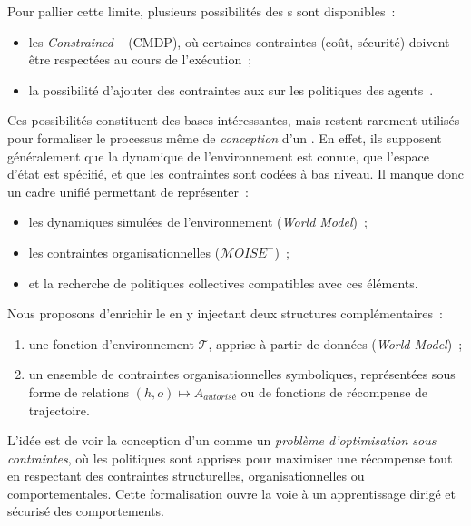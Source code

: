 \medskip

\noindent
Pour pallier cette limite, plusieurs possibilités des s sont disponibles~:
\begin{itemize}
  \item les \textit{Constrained }~\cite{Altman1999} (CMDP), où certaines contraintes (coût, sécurité) doivent être respectées au cours de l'exécution~;
  \item la possibilité d'ajouter des contraintes aux  sur les politiques des agents~\cite{Beynier2010}.
\end{itemize}

\noindent
Ces possibilités constituent des bases intéressantes, mais restent rarement utilisés pour formaliser le processus même de \textit{conception} d'un . En effet, ils supposent généralement que la dynamique de l'environnement est connue, que l'espace d'état est spécifié, et que les contraintes sont codées à bas niveau. Il manque donc un cadre unifié permettant de représenter~:
\begin{itemize}
  \item les dynamiques simulées de l'environnement (\textit{World Model})~;
  \item les contraintes organisationnelles ($\mathcal{M}OISE^+$)~;
  \item et la recherche de politiques collectives compatibles avec ces éléments.
\end{itemize}

\medskip

\noindent
Nous proposons d'enrichir le  en y injectant deux structures complémentaires~:
\begin{enumerate}
  \item une fonction d'environnement $\mathcal{T}$, apprise à partir de données (\textit{World Model})~;
  \item un ensemble de contraintes organisationnelles symboliques, représentées sous forme de relations $(h, o) \mapsto A_{autorisé}$ ou de fonctions de récompense de trajectoire.
\end{enumerate}

\noindent
L'idée est de voir la conception d'un  comme un \textit{problème d'optimisation sous contraintes}, où les politiques sont apprises pour maximiser une récompense tout en respectant des contraintes structurelles, organisationnelles ou comportementales. Cette formalisation ouvre la voie à un apprentissage dirigé et sécurisé des comportements.

